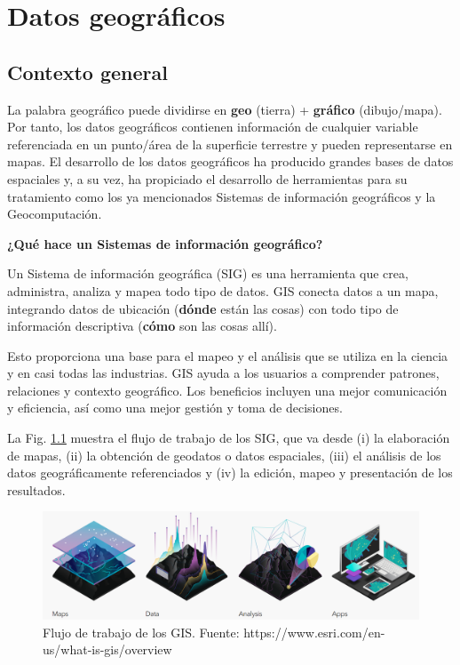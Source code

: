 \documentclass[
]{report}
\begin{document}
\hypertarget{datos-geogruxe1ficos}{%
\chapter{Datos geográficos}\label{datos-geogruxe1ficos}}

\hypertarget{contexto-general}{%
\section{Contexto general}\label{contexto-general}}

La palabra geográfico puede dividirse en \textbf{geo} (tierra) + \textbf{gráfico}
(dibujo/mapa). Por tanto, los datos geográficos contienen información de
cualquier variable referenciada en un punto/área de la superficie terrestre y
pueden representarse en mapas. El desarrollo de los datos geográficos ha
producido grandes bases de datos espaciales y, a su vez, ha propiciado el
desarrollo de herramientas para su tratamiento como los ya mencionados Sistemas
de información geográficos y la Geocomputación.

\textbf{¿Qué hace un Sistemas de información geográfico?}

Un Sistema de información geográfica (SIG) es una herramienta que crea,
administra, analiza y mapea todo tipo de datos. GIS conecta datos a un mapa,
integrando datos de ubicación (\textbf{dónde} están las cosas) con todo tipo de
información descriptiva (\textbf{cómo} son las cosas allí).

Esto proporciona una base para el mapeo y el análisis que se utiliza en la
ciencia y en casi todas las industrias. GIS ayuda a los usuarios a comprender
patrones, relaciones y contexto geográfico. Los beneficios incluyen una mejor
comunicación y eficiencia, así como una mejor gestión y toma de decisiones.

La Fig. \ref{fig:gisflujo} muestra el flujo de trabajo de los SIG, que va desde
(i) la elaboración de mapas, (ii) la obtención de geodatos o datos espaciales,
(iii) el análisis de los datos geográficamente referenciados y (iv) la edición,
mapeo y presentación de los resultados.

\begin{figure}

{\centering \includegraphics[width=0.7\linewidth]{img/GIS} 

}

\caption{Flujo de trabajo de los GIS. Fuente: https://www.esri.com/en-us/what-is-gis/overview}\label{fig:gisflujo}
\end{figure}
\end{document}
